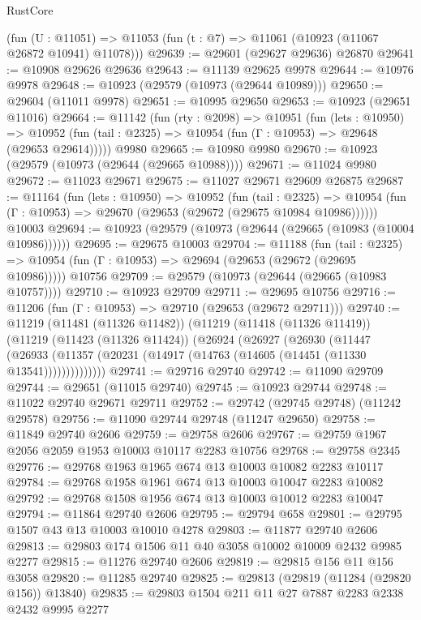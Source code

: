\begin{lexlean}{RustCore}
\begin{coremodule}
    (fun (U : @11051) => @11053 (fun (t : @7) => @11061 (@10923 (@11067 @26872 @10941) @11078)))
@29639 := @29601 (@29627 @29636) @26870
@29641 := @10908 @29626 @29636
@29643 := @11139 @29625 @9978
@29644 := @10976 @9978
@29648 := @10923 (@29579 (@10973 (@29644 @10989)))
@29650 := @29604 (@11011 @9978)
@29651 := @10995 @29650
@29653 := @10923 (@29651 @11016)
@29664 := @11142
    (fun (rty : @2098) =>
    @10951
      (fun (lets : @10950) =>
      @10952 (fun (tail : @2325) => @10954 (fun (Γ : @10953) => @29648 (@29653 @29614)))))
    @9980
@29665 := @10980 @9980
@29670 := @10923 (@29579 (@10973 (@29644 (@29665 @10988))))
@29671 := @11024 @9980
@29672 := @11023 @29671
@29675 := @11027 @29671 @29609 @26875
@29687 := @11164
    (fun (lets : @10950) =>
    @10952
      (fun (tail : @2325) =>
      @10954 (fun (Γ : @10953) => @29670 (@29653 (@29672 (@29675 @10984 @10986))))))
    @10003
@29694 := @10923 (@29579 (@10973 (@29644 (@29665 (@10983 (@10004 @10986))))))
@29695 := @29675 @10003
@29704 := @11188
    (fun (tail : @2325) => @10954 (fun (Γ : @10953) => @29694 (@29653 (@29672 (@29695 @10986)))))
    @10756
@29709 := @29579 (@10973 (@29644 (@29665 (@10983 @10757))))
@29710 := @10923 @29709
@29711 := @29695 @10756
@29716 := @11206 (fun (Γ : @10953) => @29710 (@29653 (@29672 @29711)))
@29740 := @11219
    (@11481 (@11326 @11482))
    (@11219
      (@11418 (@11326 @11419))
      (@11219
        (@11423 (@11326 @11424))
        (@26924
          (@26927
            (@26930
              (@11447
                (@26933 (@11357 (@20231 (@14917 (@14763 (@14605 (@14451 (@11330 @13541))))))))))))))
@29741 := @29716 @29740
@29742 := @11090 @29709
@29744 := @29651 (@11015 @29740)
@29745 := @10923 @29744
@29748 := @11022 @29740 @29671 @29711
@29752 := @29742 (@29745 @29748) (@11242 @29578)
@29756 := @11090 @29744 @29748 (@11247 @29650)
@29758 := @11849 @29740 @2606
@29759 := @29758 @2606
@29767 := @29759 @1967 @2056 @2059 @1953 @10003 @10117 @2283 @10756
@29768 := @29758 @2345
@29776 := @29768 @1963 @1965 @674 @13 @10003 @10082 @2283 @10117
@29784 := @29768 @1958 @1961 @674 @13 @10003 @10047 @2283 @10082
@29792 := @29768 @1508 @1956 @674 @13 @10003 @10012 @2283 @10047
@29794 := @11864 @29740 @2606
@29795 := @29794 @658
@29801 := @29795 @1507 @43 @13 @10003 @10010 @4278
@29803 := @11877 @29740 @2606
@29813 := @29803 @174 @1506 @11 @40 @3058 @10002 @10009 @2432 @9985 @2277
@29815 := @11276 @29740 @2606
@29819 := @29815 @156 @11 @156 @3058
@29820 := @11285 @29740
@29825 := @29813 (@29819 (@11284 (@29820 @156)) @13840)
@29835 := @29803 @1504 @211 @11 @27 @7887 @2283 @2338 @2432 @9995 @2277

\end{coremodule}
\end{lexlean}
